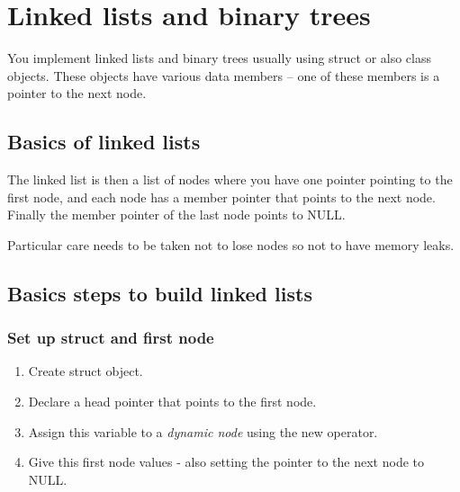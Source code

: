 \section{Linked lists and binary trees}
You implement linked lists and binary trees usually using struct or also class objects. These
objects have various data members -- one of these members is a pointer to the next node.


\subsection{Basics of linked lists}
The linked list is then a list of nodes where you have one pointer pointing to the first
node, and each node has a member pointer that points to the next node. Finally the 
member pointer of the last node points to NULL.

Particular care needs to be taken not to lose nodes so not to have memory leaks.


\subsection{Basics steps to build linked lists}

\subsubsection*{Set up struct and first node}
\begin{enumerate}
	\item Create struct object.
	\item Declare a head pointer that points to the first node.
	\item Assign this variable to a \emph{dynamic node} using the new operator.
	\item Give this first node values - also setting the pointer to the next node to NULL.
\end{enumerate}


